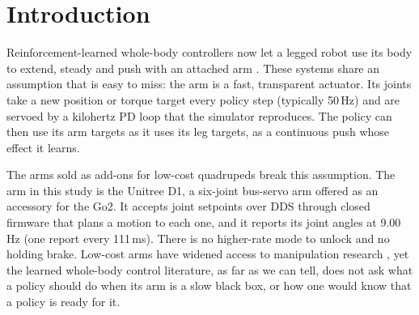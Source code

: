 \documentclass[conference]{IEEEtran}
\begin{document}
\section{Introduction}

Reinforcement-learned whole-body controllers now let a legged robot use its body to extend, steady and push with an
attached arm \citep{fu2022deep, liu2024visual, ha2024umi, portela2024learning, zhi2025unified, liu2026mlm}. These systems share an assumption that is easy to
miss: the arm is a fast, transparent actuator. Its joints take a new position or torque target every policy step
(typically 50\,Hz) and are servoed by a kilohertz PD loop that the simulator reproduces. The policy can then use its arm
targets as it uses its leg targets, as a continuous push whose effect it learns.

The arms sold as add-ons for low-cost quadrupeds break this assumption. The arm in this study is the Unitree D1, a
six-joint bus-servo arm offered as an accessory for the Go2. It accepts joint setpoints over DDS through closed firmware
that plans a motion to each one, and it reports its joint angles at 9.00\,Hz (one report every 111\,ms). There is no
higher-rate mode to unlock and no holding brake. Low-cost arms have widened access to manipulation research
\citep{zhao2023learning}, yet the learned whole-body control literature, as far as we can tell, does not ask what a policy should do when its arm is
a slow black box, or how one would know that a policy is ready for it.
\end{document}
